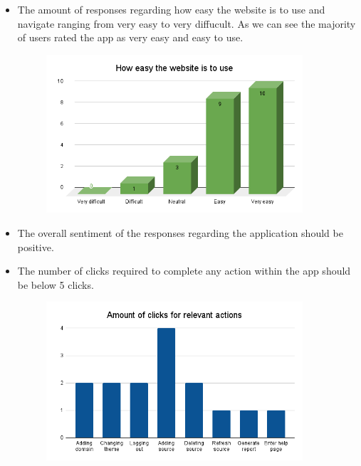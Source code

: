 \documentclass[12pt]{article}
\begin{document}
\begin{itemize}
\begin{itemize}
\begin{figure}[H]
              \end{figure}
              \item The amount of responses regarding how easy the website is to use and navigate ranging from very easy to very diffucult. As we can see the majority of users rated the app as very easy and easy to use.
              \begin{figure}[H]
                \centering
                \includegraphics[width=0.9\textwidth]{How easy the website is to use.png}
              \end{figure}
              \item The overall sentiment of the responses regarding the application should be positive.
              \item The number of clicks required to complete any action within the app should be below 5 clicks.
              \begin{figure}[H]
                \centering
                \includegraphics[width=0.9\textwidth]{Amount of clicks for relevant actions-2.png}
              \end{figure}
          \end{itemize}
\end{itemize}
\end{document}

